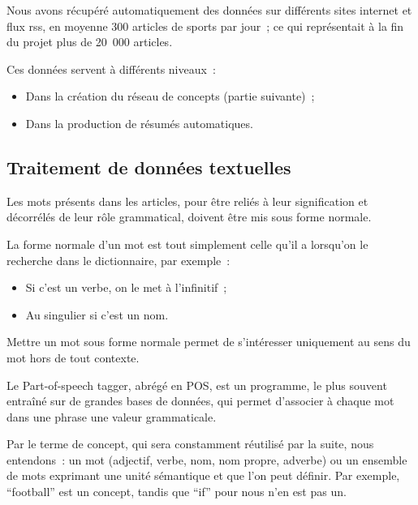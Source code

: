 \documentclass[a4paper, 12pt]{article}
\begin{document}
Nous avons récupéré automatiquement des données sur différents sites internet et flux rss, en moyenne 300 articles de sports par jour~; ce qui représentait à la fin du projet plus de 20~000 articles.

Ces données servent à différents niveaux~:
\begin{itemize}
 \item Dans la création du réseau de concepts (partie suivante)~;
 \item Dans la production de résumés automatiques.
\end{itemize}



\subsection{Traitement de données textuelles}

Les mots présents dans les articles, pour être reliés à leur signification et décorrélés de leur rôle grammatical, doivent être mis sous forme normale.

\begin{definition}
La forme normale d'un mot est tout simplement celle qu'il a lorsqu'on le recherche dans le dictionnaire, par exemple~:
\begin{itemize}
 \item Si c'est un verbe, on le met à l'infinitif~;
 \item Au singulier si c'est un nom.
\end{itemize}
Mettre un mot sous forme normale permet de s'intéresser uniquement au sens du mot hors de tout contexte.
\end{definition}


\begin{definition}
Le Part-of-speech tagger, abrégé en POS, est un programme, le plus souvent entraîné sur de grandes bases de données, qui permet d'associer à chaque mot dans une phrase une valeur grammaticale.
\end{definition}

\begin{definition}[Concept]
Par le terme de concept, qui sera constamment réutilisé par la suite, nous entendons~: un mot (adjectif, verbe, nom, nom propre, adverbe) ou un ensemble de mots exprimant une unité sémantique et que l'on peut définir. Par exemple, ``football'' est un concept, tandis que ``if'' pour nous n'en est pas un.
\end{definition}
\end{document}
